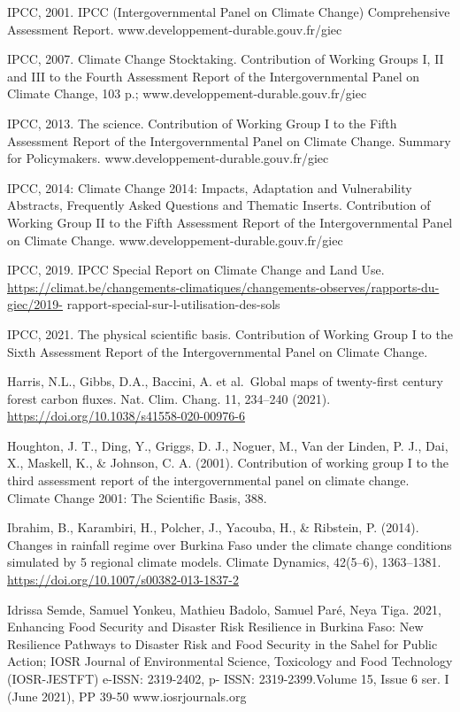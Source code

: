 \documentclass[
]{book}
\begin{document}
IPCC, 2001. IPCC (Intergovernmental Panel on Climate Change) Comprehensive Assessment Report. www.developpement-durable.gouv.fr/giec

IPCC, 2007. Climate Change Stocktaking. Contribution of Working Groups I, II and III to the Fourth Assessment Report of the Intergovernmental Panel on Climate Change, 103 p.; www.developpement-durable.gouv.fr/giec

IPCC, 2013. The science. Contribution of Working Group I to the Fifth Assessment Report of the Intergovernmental Panel on Climate Change. Summary for Policymakers. www.developpement-durable.gouv.fr/giec

IPCC, 2014: Climate Change 2014: Impacts, Adaptation and Vulnerability Abstracts, Frequently Asked Questions and Thematic Inserts. Contribution of Working Group II to the Fifth Assessment Report of the Intergovernmental Panel on Climate Change. www.developpement-durable.gouv.fr/giec

IPCC, 2019. IPCC Special Report on Climate Change and Land Use. \url{https://climat.be/changements-climatiques/changements-observes/rapports-du-giec/2019-} rapport-special-sur-l-utilisation-des-sols

IPCC, 2021. The physical scientific basis. Contribution of Working Group I to the Sixth Assessment Report of the Intergovernmental Panel on Climate Change.

Harris, N.L., Gibbs, D.A., Baccini, A. et al.~Global maps of twenty-first century forest carbon fluxes. Nat. Clim. Chang. 11, 234--240 (2021). \url{https://doi.org/10.1038/s41558-020-00976-6}

Houghton, J. T., Ding, Y., Griggs, D. J., Noguer, M., Van der Linden, P. J., Dai, X., Maskell, K., \& Johnson, C. A. (2001). Contribution of working group I to the third assessment report of the intergovernmental panel on climate change. Climate Change 2001: The Scientific Basis, 388.

Ibrahim, B., Karambiri, H., Polcher, J., Yacouba, H., \& Ribstein, P. (2014). Changes in rainfall regime over Burkina Faso under the climate change conditions simulated by 5 regional climate models. Climate Dynamics, 42(5--6), 1363--1381. \url{https://doi.org/10.1007/s00382-013-1837-2}

Idrissa Semde, Samuel Yonkeu, Mathieu Badolo, Samuel Paré, Neya Tiga. 2021, Enhancing Food Security and Disaster Risk Resilience in Burkina Faso: New Resilience Pathways to Disaster Risk and Food Security in the Sahel for Public Action; IOSR Journal of Environmental Science, Toxicology and Food Technology (IOSR-JESTFT) e-ISSN: 2319-2402, p- ISSN: 2319-2399.Volume 15, Issue 6 ser. I (June 2021), PP 39-50 www.iosrjournals.org
\end{document}
